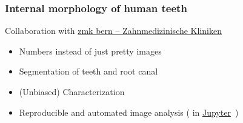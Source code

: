 \documentclass[aspectratio=169]{beamer}
\newcommand{\imwidth}{\linewidth}%
\newcommand{\imheight}{0.8\paperheight}%
\begin{document}
\begin{frame}
	\frametitle{Internal morphology of human teeth}
	Collaboration with \href{https://www.zmk.unibe.ch/}{zmk bern – Zahnmedizinische Kliniken}
	\begin{itemize}
		\item Numbers instead of just pretty images
		\item Segmentation of teeth and root canal
		\item (Unbiased) Characterization
		\item Reproducible and automated image analysis (\href{https://www.python.org/}{\faPython} in \href{https://jupyter.org/}{Jupyter}~\cite{Kluyver2016})
	\end{itemize}
\end{frame}

\renewcommand{\imwidth}{0.75\linewidth}
\renewcommand{\imheight}{0.618\paperheight}
\end{document}
